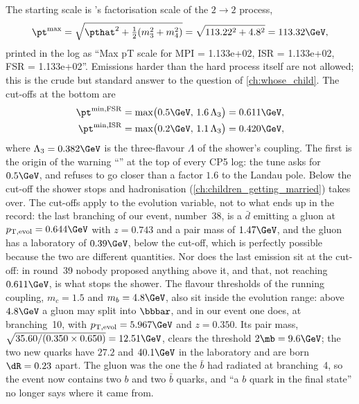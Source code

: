 The starting scale is \PYTHIA's factorisation scale of the $2\to2$ process,
\begin{equation}
  \pt^{\max}=\sqrt{\pthat^2+\tfrac12(m_3^2+m_4^2)}=\sqrt{113.22^2+4.8^2}=113.32\GeV ,
  \label{eq:mother_gives_birth:ptmax}
\end{equation}
printed in the log as ``Max pT scale for MPI = 1.133e+02, ISR = 1.133e+02,
FSR = 1.133e+02''. Emissions harder than the hard process itself are not
allowed; this is the crude but standard answer to the question of
\cref{ch:whose_child}. The cut-offs at the bottom are
\begin{equation}
\begin{aligned}
  \pt^{\min,\mathrm{FSR}}&=\max\bigl(0.5\GeV,\,1.6\,\Lambda_3\bigr)=0.611\GeV,\\
  \pt^{\min,\mathrm{ISR}}&=\max\bigl(0.2\GeV,\,1.1\,\Lambda_3\bigr)=0.420\GeV,
\end{aligned}
  \label{eq:mother_gives_birth:ptmin}
\end{equation}
where $\Lambda_3=0.382\GeV$ is the three-flavour $\Lambda$ of the shower's
coupling. The first is the origin of the warning
``'' at the top
of every CP5 log: the tune asks for $0.5\GeV$, and \PYTHIA refuses to go
closer than a factor $1.6$ to the Landau pole. Below the cut-off the
shower stops and hadronisation (\cref{ch:children_getting_married}) takes over.
The cut-offs apply to the evolution variable, not to what ends up in the
record: the last branching of our event, number~38, is a $\bar d$ emitting
a gluon at $\ptevol=0.644\GeV$ with $z=0.743$ and a pair mass of
$1.47\GeV$, and the gluon has a laboratory \pt of $0.39\GeV$, below the
cut-off, which is perfectly possible because the two are different
quantities. Nor does the last emission sit at the cut-off: in round~39
nobody proposed anything above it, and that, not reaching $0.611\GeV$, is
what stops the shower. The flavour thresholds of the running coupling,
$m_c=1.5$ and $m_b=4.8\GeV$, also sit inside the evolution range: above
$4.8\GeV$ a gluon may split into $\bbbar$, and in our event one does, at
branching~10, with $\ptevol=5.967\GeV$ and $z=0.350$. Its pair mass,
$\sqrt{35.60/(0.350\times0.650)}=12.51\GeV$, clears the threshold
$2\mb=9.6\GeV$; the two new quarks have $27.2$ and $40.1\GeV$ in the
laboratory and are born $\dR=0.23$ apart. The gluon was the one the
$\bar b$ had radiated at branching~4, so the event now contains two $b$
and two $\bar b$ quarks, and ``a $b$ quark in the final state'' no longer
says where it came from.

